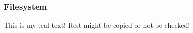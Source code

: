 \subsubsection{Filesystem} \label{subsubsection:counter-reengineering-break-filesystem}
This is my real text! Rest might be copied or not be checked!
